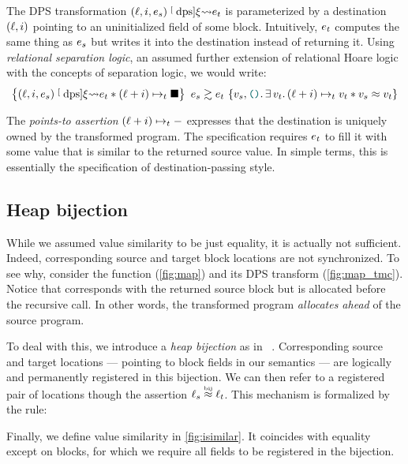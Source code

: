 The DPS transformation $(\datalangLoc, \datalangIdx, \datalangExpr_s) \tmcDps{\datalangRenaming} \datalangExpr_t$ is parameterized by a destination $(\datalangLoc, \datalangIdx)$ pointing to an uninitialized field of some block.
Intuitively, $\datalangExpr_t$ computes the same thing as $\datalangExpr_s$ but writes it into the destination instead of returning it.
Using \emph{relational separation logic}, an assumed further extension of relational Hoare logic with the concepts of separation logic, we would write:
\[
    \iSimvHoare{
        (\datalangLoc, \datalangIdx, \datalangExpr_s) \tmcDps{\datalangRenaming} \datalangExpr_t \iSep
        (\datalangLoc + \datalangIdx) \iPointsto_t \datalangHole
    }{
        \datalangVal_s, \datalangUnit \ldotp
        \exists \datalangVal_t \ldotp
        (\datalangLoc + \datalangIdx) \iPointsto_t \datalangVal_t \iSep
        \datalangVal_s \iSimilar \datalangVal_t
    }{
        \datalangExpr_s
    }{
        \datalangExpr_t
    }
\]

The \emph{points-to assertion} $(\datalangLoc + \datalangIdx) \iPointsto_t -$ expresses that the destination is uniquely owned by the transformed program.
The specification requires $\datalangExpr_t$ to fill it with some value that is similar to the returned source value.
In simple terms, this is essentially the specification of destination-passing style.

\subsection{Heap bijection}

While we assumed value similarity to be just equality, it is actually not sufficient.
Indeed, corresponding source and target block locations are not synchronized.
To see why, consider the  function (\cref{fig:map}) and its DPS transform (\cref{fig:map_tmc}).
Notice that  corresponds with the returned source block  but is allocated before the recursive call.
In other words, the transformed program \emph{allocates ahead} of the source program.

To deal with this, we introduce a \emph{heap bijection} as in \Simuliris~\cite{DBLP:journals/pacmpl/GaherSSJDKKD22}.
Corresponding source and target locations --- pointing to block fields in our semantics --- are logically and permanently registered in this bijection. 
We can then refer to a registered pair of locations though the assertion $\datalangLoc_s \iInBij \datalangLoc_t$.
This mechanism is formalized by the  rule:

\begin{mathpar}
\end{mathpar}

Finally, we define value similarity in \cref{fig:isimilar}.
It coincides with equality except on blocks, for which we require all fields to be registered in the bijection.

